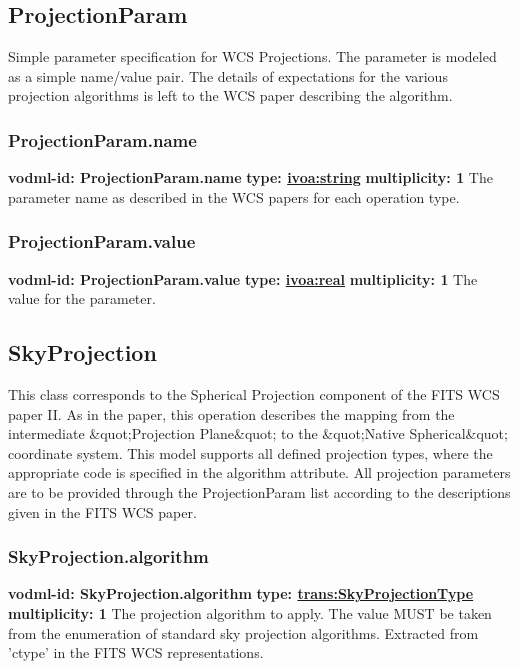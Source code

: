   \subsection{ProjectionParam}
  \label{sect:ProjectionParam}
    Simple parameter specification for WCS Projections. The parameter is modeled as a simple name/value pair. The details of expectations for the various projection algorithms is left to the WCS paper describing the algorithm.

    \subsubsection{ProjectionParam.name}
      \textbf{vodml-id: ProjectionParam.name} \newline
      \textbf{type: \hyperref[sect:ivoa]{ivoa:string}} \newline
      \textbf{multiplicity: 1} \newline 
      The parameter name as described in the WCS papers for each operation type.

    \subsubsection{ProjectionParam.value}
      \textbf{vodml-id: ProjectionParam.value} \newline
      \textbf{type: \hyperref[sect:ivoa]{ivoa:real}} \newline
      \textbf{multiplicity: 1} \newline 
      The value for the parameter.

  \subsection{SkyProjection}
  \label{sect:SkyProjection}
    This class corresponds to the Spherical Projection component of the FITS WCS paper II. As in the paper, this operation describes the mapping from the intermediate \&quot;Projection Plane\&quot; to the \&quot;Native Spherical\&quot; coordinate system. This model supports all defined projection types, where the appropriate code is specified in the algorithm attribute. All projection parameters are to be provided through the ProjectionParam list according to the descriptions given in the FITS WCS paper.

    \subsubsection{SkyProjection.algorithm}
      \textbf{vodml-id: SkyProjection.algorithm} \newline
      \textbf{type: \hyperref[sect:SkyProjectionType]{trans:SkyProjectionType}} \newline
      \textbf{multiplicity: 1} \newline 
      The projection algorithm to apply. The value MUST be taken from the enumeration of standard sky projection algorithms. Extracted from 'ctype' in the FITS WCS representations.

